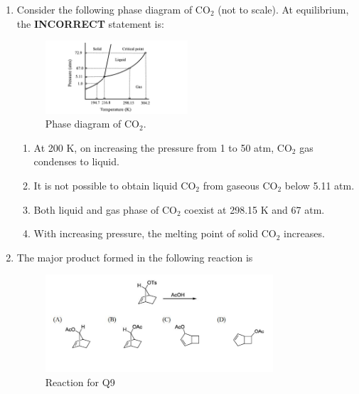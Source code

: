 \documentclass[journal,12pt,onecolumn]{IEEEtran}
\theoremstyle{remark}
\begin{document}
\begin{enumerate}
\newpage
\item Consider the following phase diagram of CO$_2$ (not to scale). At equilibrium, the \textbf{INCORRECT} statement is: \hfill{}

\begin{figure}[h!]
    \centering
    \includegraphics[width=0.5\textwidth]{figs/image2.png}
    \caption{Phase diagram of CO$_2$.}
    \label{fig:co2phasediagram}
\end{figure}


\begin{enumerate}
    \item At 200 K, on increasing the pressure from 1 to 50 atm, CO$_2$ gas condenses to liquid.
    \item It is not possible to obtain liquid CO$_2$ from gaseous CO$_2$ below 5.11 atm.
    \item Both liquid and gas phase of CO$_2$ coexist at 298.15 K and 67 atm.
    \item With increasing pressure, the melting point of solid CO$_2$ increases.
\end{enumerate}






\item The major product formed in the following reaction is \hfill{}

\begin{figure}[h!]
    \centering
    \includegraphics[width=0.8\textwidth]{figs/image3.png}
    \caption{Reaction for Q9}
    \label{fig:q9reaction}
\end{figure}




\end{enumerate}
\end{document}
